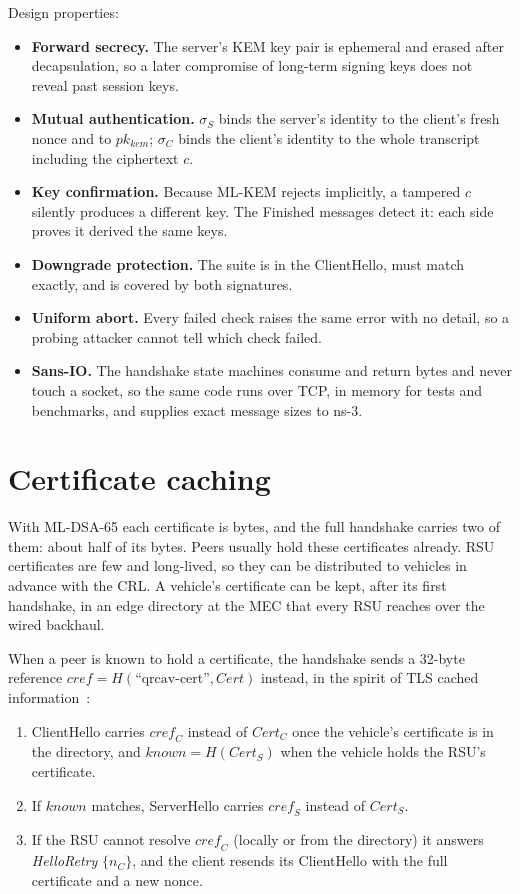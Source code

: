 Design properties:
\begin{itemize}
\item \textbf{Forward secrecy.} The server's KEM key pair is ephemeral and
erased after decapsulation, so a later compromise of long-term signing keys
does not reveal past session keys.
\item \textbf{Mutual authentication.} $\sigma_S$ binds the server's identity
to the client's fresh nonce and to $pk_{kem}$; $\sigma_C$ binds the client's
identity to the whole transcript including the ciphertext $c$.
\item \textbf{Key confirmation.} Because ML-KEM rejects implicitly, a
tampered $c$ silently produces a different key. The Finished messages detect
it: each side proves it derived the same keys.
\item \textbf{Downgrade protection.} The suite is in the ClientHello, must
match exactly, and is covered by both signatures.
\item \textbf{Uniform abort.} Every failed check raises the same error with no
detail, so a probing attacker cannot tell which check failed.
\item \textbf{Sans-IO.} The handshake state machines consume and return bytes
and never touch a socket, so the same code runs over TCP, in memory for tests
and benchmarks, and supplies exact message sizes to ns-3.
\end{itemize}

\section{Certificate caching}
\label{sec:cache}

With ML-DSA-65 each certificate is  bytes, and the full handshake
carries two of them: about half of its  bytes. Peers usually
hold these certificates already. RSU certificates are few and long-lived, so
they can be distributed to vehicles in advance with the CRL. A vehicle's
certificate can be kept, after its first handshake, in an edge directory at the
MEC that every RSU reaches over the wired backhaul.

When a peer is known to hold a certificate, the handshake sends a 32-byte
reference $\mathit{cref} = H(\text{``qrcav-cert''}, Cert)$ instead, in the
spirit of TLS cached information~\cite{rfc7924}:

\begin{enumerate}
\item ClientHello carries $\mathit{cref}_C$ instead of $Cert_C$ once the
vehicle's certificate is in the directory, and $known = H(Cert_S)$ when the
vehicle holds the RSU's certificate.
\item If $known$ matches, ServerHello carries $\mathit{cref}_S$ instead of
$Cert_S$.
\item If the RSU cannot resolve $\mathit{cref}_C$ (locally or from the
directory) it answers \emph{HelloRetry} $\{n_C\}$, and the client resends its
ClientHello with the full certificate and a new nonce.
\end{enumerate}

